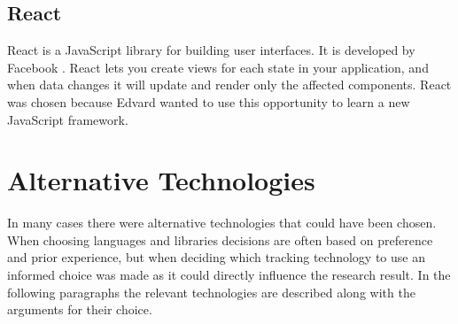 \documentclass[../Main/thesis.tex]{subfiles}
\begin{document}
\subsection{React}
React is a JavaScript library for building user interfaces.
It is developed by Facebook \citep{FacebookInc.2014}.
React lets you create views for each state in your application, and when data changes it will update and render only the affected components.
React was chosen because Edvard wanted to use this opportunity to learn a new JavaScript framework.

\section{Alternative Technologies}
In many cases there were alternative technologies that could have been chosen.
When choosing languages and libraries decisions are often based on preference and prior experience, but when deciding which tracking technology to use an informed choice was made as it could directly influence the research result.
In the following paragraphs the relevant technologies are described along with the arguments for their choice.
\end{document}
